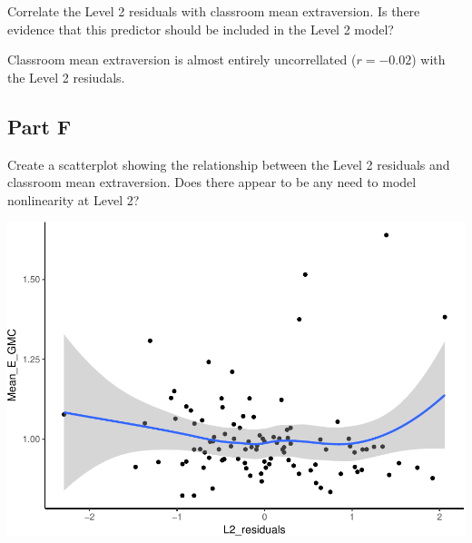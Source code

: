 \documentclass[]{article}
\newenvironment{Shaded}{\begin{snugshade}}{\end{snugshade}}
\newcommand{\KeywordTok}[1]{\textcolor[rgb]{0.13,0.29,0.53}{\textbf{#1}}}
\newcommand{\DataTypeTok}[1]{\textcolor[rgb]{0.13,0.29,0.53}{#1}}
\newcommand{\StringTok}[1]{\textcolor[rgb]{0.31,0.60,0.02}{#1}}
\newcommand{\OperatorTok}[1]{\textcolor[rgb]{0.81,0.36,0.00}{\textbf{#1}}}
\newcommand{\NormalTok}[1]{#1}
\begin{document}
Correlate the Level 2 residuals with classroom mean extraversion. Is
there evidence that this predictor should be included in the Level 2
model?

\begin{Shaded}
\end{Shaded}

Classroom mean extraversion is almost entirely uncorrellated
(\(r = -0.02\)) with the Level 2 resiudals.

\subsection{Part F}\label{part-f}

Create a scatterplot showing the relationship between the Level 2
residuals and classroom mean extraversion. Does there appear to be any
need to model nonlinearity at Level 2?

\begin{Shaded}
\end{Shaded}

\includegraphics{Beck_HW_5_files/figure-latex/unnamed-chunk-12-1.pdf}
\end{document}

